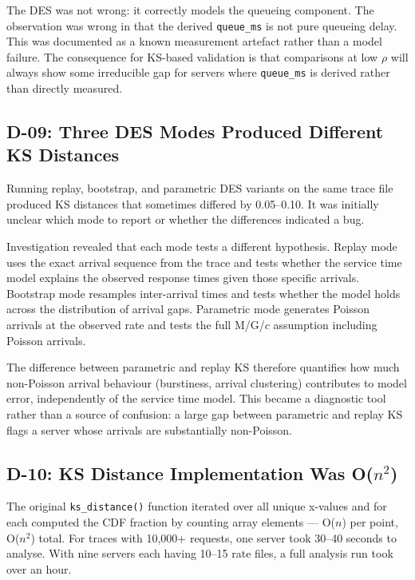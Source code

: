 The DES was not wrong: it correctly models the queueing component. The observation was wrong in that the derived \texttt{queue\_ms} is not pure queueing delay. This was documented as a known measurement artefact rather than a model failure. The consequence for KS-based validation is that comparisons at low $\rho$ will always show some irreducible gap for servers where \texttt{queue\_ms} is derived rather than directly measured.

\subsection{D-09: Three DES Modes Produced Different KS Distances}

Running replay, bootstrap, and parametric DES variants on the same trace file produced KS distances that sometimes differed by 0.05--0.10. It was initially unclear which mode to report or whether the differences indicated a bug.

Investigation revealed that each mode tests a different hypothesis. Replay mode uses the exact arrival sequence from the trace and tests whether the service time model explains the observed response times given those specific arrivals. Bootstrap mode resamples inter-arrival times and tests whether the model holds across the distribution of arrival gaps. Parametric mode generates Poisson arrivals at the observed rate and tests the full M/G/$c$ assumption including Poisson arrivals.

The difference between parametric and replay KS therefore quantifies how much non-Poisson arrival behaviour (burstiness, arrival clustering) contributes to model error, independently of the service time model. This became a diagnostic tool rather than a source of confusion: a large gap between parametric and replay KS flags a server whose arrivals are substantially non-Poisson.

\subsection{D-10: KS Distance Implementation Was O($n^2$)}

The original \texttt{ks\_distance()} function iterated over all unique x-values and for each computed the CDF fraction by counting array elements — O($n$) per point, O($n^2$) total. For traces with 10{,}000+ requests, one server took 30--40 seconds to analyse. With nine servers each having 10--15 rate files, a full analysis run took over an hour.

